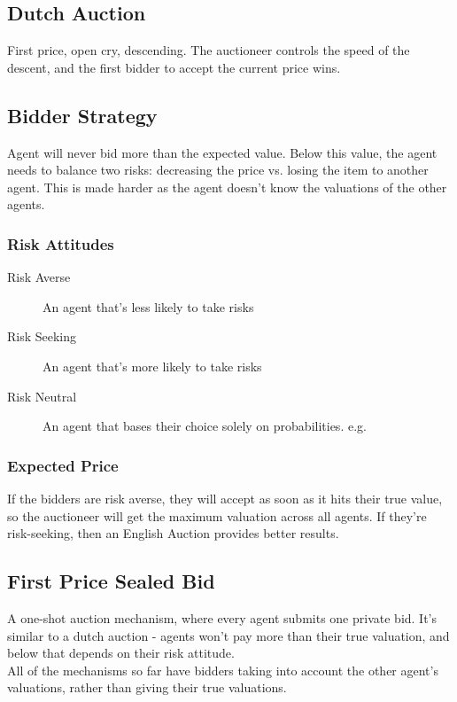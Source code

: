 \subsection{Dutch Auction}
First price, open cry, descending. The auctioneer controls the speed of the descent, and the first bidder to accept the current price wins. 
\subsection{Bidder Strategy}
Agent will never bid more than the expected value. Below this value, the agent needs to balance two risks: decreasing the price vs. losing the item to another agent. This is made harder as the agent doesn't know the valuations of the other agents. 

\subsubsection{Risk Attitudes}
\begin{description}
    \item[Risk Averse] An agent that's less likely to take risks
    \item[Risk Seeking] An agent that's more likely to take risks
    \item[Risk Neutral] An agent that bases their choice solely on probabilities. e.g. 
\end{description}

\subsubsection{Expected Price}
If the bidders are risk averse, they will accept as soon as it hits their true value, so the auctioneer will get the maximum valuation across all agents. If they're risk-seeking, then an English Auction provides better results.

\subsection{First Price Sealed Bid}
A one-shot auction mechanism, where every agent submits one private bid. It's similar to a dutch auction - agents won't pay more than their true valuation, and below that depends on their risk attitude.\\

All of the mechanisms so far have bidders taking into account the other agent's valuations, rather than giving their true valuations.

